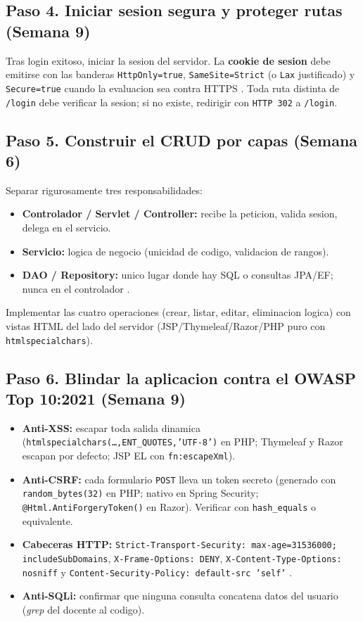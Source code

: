 \documentclass[10pt,a4paper]{article}
\begin{document}
\subsection*{Paso 4. Iniciar sesion segura y proteger rutas (Semana 9)}
Tras login exitoso, iniciar la sesion del servidor. La \textbf{cookie de sesion} debe emitirse con las banderas \texttt{HttpOnly=true}, \texttt{SameSite=Strict} (o \texttt{Lax} justificado) y \texttt{Secure=true} cuando la evaluacion sea contra HTTPS \cite{owasp2021top10}. Toda ruta distinta de \texttt{/login} debe verificar la sesion; si no existe, redirigir con \texttt{HTTP 302} a \texttt{/login}.

\subsection*{Paso 5. Construir el CRUD por capas (Semana 6)}
Separar rigurosamente tres responsabilidades:
\begin{itemize}[leftmargin=1.4em,itemsep=1pt,topsep=2pt]
    \item \textbf{Controlador / Servlet / Controller:} recibe la peticion, valida sesion, delega en el servicio.
    \item \textbf{Servicio:} logica de negocio (unicidad de codigo, validacion de rangos).
    \item \textbf{DAO / Repository:} unico lugar donde hay SQL o consultas JPA/EF; nunca en el controlador \cite{walls2022spring}.
\end{itemize}
Implementar las cuatro operaciones (crear, listar, editar, eliminacion logica) con vistas HTML del lado del servidor (JSP/Thymeleaf/Razor/PHP puro con \texttt{htmlspecialchars}).

\subsection*{Paso 6. Blindar la aplicacion contra el OWASP Top 10:2021 (Semana 9)}
\begin{itemize}[leftmargin=1.4em,itemsep=1pt,topsep=2pt]
    \item \textbf{Anti-XSS:} escapar toda salida dinamica (\texttt{htmlspecialchars(\dots,ENT\_QUOTES,'UTF-8')} en PHP; Thymeleaf y Razor escapan por defecto; JSP EL con \texttt{fn:escapeXml}).
    \item \textbf{Anti-CSRF:} cada formulario \texttt{POST} lleva un token secreto (generado con \texttt{random\_bytes(32)} en PHP; nativo en Spring Security; \texttt{@Html.AntiForgeryToken()} en Razor). Verificar con \texttt{hash\_equals} o equivalente.
    \item \textbf{Cabeceras HTTP:} \texttt{Strict-Transport-Security: max-age=31536000; includeSubDomains}, \texttt{X-Frame-Options: DENY}, \texttt{X-Content-Type-Options: nosniff} y \texttt{Content-Security-Policy: default-src 'self'} \cite{owasp2021top10}.
    \item \textbf{Anti-SQLi:} confirmar que ninguna consulta concatena datos del usuario (\emph{grep} del docente al codigo).
\end{itemize}
\end{document}

